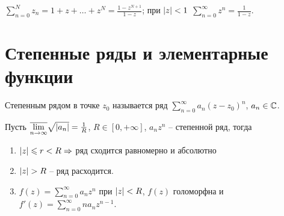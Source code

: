 \begin{proposition}
	$\sum_{n = 0}^N z_n = 1 + z + \ldots + z^N = \frac{1 - z^{N + 1}}{1 - z}$; при $\mathopen{}\left\lvert z\right\rvert\mathclose{} < 1$ $\sum_{n = 0}^\infty z^n = \frac{1}{1 - z}$. %
\end{proposition}

\section{Степенные ряды и элементарные функции}

\begin{definition}
	Степенным рядом в точке $z_0$ называется ряд $\sum_{n = 0}^\infty a_n {(z - z_0)}^n$, $a_n \in \mathbb{C}$.
\end{definition}

\begin{theorem}
	Пусть $\overline{\lim\limits_{n \to \infty}} \sqrt{\mathopen{}\left\lvert a_n\right\rvert\mathclose{}} = \frac{1}{R}$, $R \in [0, +\infty]$, $a_n z^n$ -- степенной ряд, тогда
	\begin{enumerate}
		\item $\mathopen{}\left\lvert z\right\rvert\mathclose{} \leqslant r < R \Rightarrow$ ряд сходится равномерно и абсолютно %
		\item $\mathopen{}\left\lvert z\right\rvert\mathclose{} > R$ -- ряд расходится.
		\item $f(z) = \sum_{n = 0}^\infty a_n z^n$ при $\mathopen{}\left\lvert z\right\rvert\mathclose{} < R$, $f(z)$ голоморфна и $f'(z) = \sum_{n = 0}^\infty n a_n z^{n - 1}$.
	\end{enumerate}
\end{theorem}

